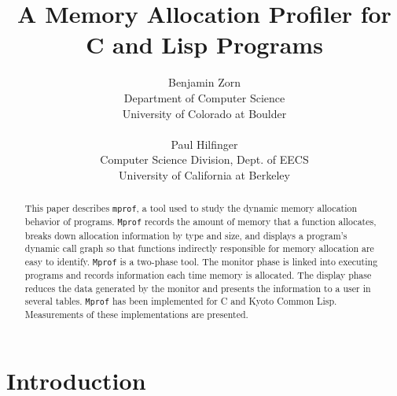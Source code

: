 


\fullpagestyle



\title{A Memory Allocation Profiler for C and Lisp Programs
}


\author{Benjamin Zorn \\
	Department of Computer Science \\
	University of Colorado at Boulder \\
	\\
	Paul Hilfinger \\
	Computer Science Division, Dept. of EECS \\
	University of California at Berkeley \\
	}

\date{}

\maketitle

\begin{singlespace}
\begin{abstract}        
This paper describes {\tt mprof}, a tool used to study the dynamic
memory allocation behavior of programs.  {\tt Mprof} records the
amount of memory that a function allocates, breaks down allocation
information by type and size, and displays a program's dynamic call
graph so that functions indirectly responsible for memory allocation
are easy to identify.  {\tt Mprof} is a two-phase tool.  The monitor
phase is linked into executing programs and records information each
time memory is allocated.  The display phase reduces the data
generated by the monitor and presents the information to a user in
several tables.  {\tt Mprof} has been implemented for C and Kyoto
Common Lisp.  Measurements of these implementations are presented.
\end{abstract}
\end{singlespace}


\section{Introduction}
\setlength{\parskip}{6pt plus 2pt}


